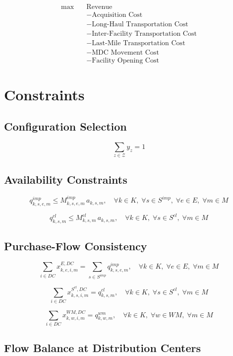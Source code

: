 \documentclass[12pt]{article}
\begin{document}
\begin{align*}
\max \quad 
& \text{Revenue} \\
& - \text{Acquisition Cost} \\
& - \text{Long-Haul Transportation Cost} \\
& - \text{Inter-Facility Transportation Cost} \\
& - \text{Last-Mile Transportation Cost} \\
& - \text{MDC Movement Cost} \\
& - \text{Facility Opening Cost}
\end{align*}

\newpage

\section{Constraints}

\subsection{Configuration Selection}

\[
\sum_{z \in \mathcal{Z}} y_z = 1
\]

\subsection{Availability Constraints}

\[
q^{imp}_{k,s,e,m} \leq M^{imp}_{k,s,e,m} \, a_{k,s,m},
\quad \forall k \in K,\; \forall s \in S^{imp},\; \forall e \in E,\; \forall m \in M
\]

\[
q^{cl}_{k,s,m} \leq M^{cl}_{k,s,m} \, a_{k,s,m},
\quad \forall k \in K,\; \forall s \in S^{cl},\; \forall m \in M
\]

\subsection{Purchase-Flow Consistency}

\[
\sum_{i \in DC} x^{E,DC}_{k,e,i,m}
=
\sum_{s \in S^{imp}} q^{imp}_{k,s,e,m},
\quad \forall k \in K,\; \forall e \in E,\; \forall m \in M
\]

\[
\sum_{i \in DC} x^{S^{cl},DC}_{k,s,i,m}
=
q^{cl}_{k,s,m},
\quad \forall k \in K,\; \forall s \in S^{cl},\; \forall m \in M
\]

\[
\sum_{i \in DC} x^{WM,DC}_{k,w,i,m}
=
q^{wm}_{k,w,m},
\quad \forall k \in K,\; \forall w \in WM,\; \forall m \in M
\]

\subsection{Flow Balance at Distribution Centers}
\end{document}
